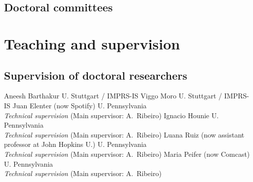 \documentclass{cvlfoc}
\begin{document}
\begin{entrydate}
\end{entrydate}


\subsection*{Doctoral committees}

\begin{entrydate}
\end{entrydate}



\section*{Teaching and supervision}
\vspace{0.2\baselineskip}

\subsection*{Supervision of doctoral researchers}

\begin{entrydate}
		{Aneesh Barthakur \hfill U. Stuttgart / IMPRS-IS}
		{Viggo Moro \hfill U. Stuttgart / IMPRS-IS}
		{Juan Elenter {\small (now Spotify)}
		\hfill U. Pennsylvania\\
			\emph{Technical supervision} \hfill(Main supervisor: A.\ Ribeiro)}
		{Ignacio Hounie \hfill U. Pennsylvania\\
			\emph{Technical supervision} \hfill(Main supervisor: A.\ Ribeiro)}
		{Luana Ruiz {\small (now assistant professor at John Hopkins U.)}
			\hfill U. Pennsylvania\\
			\emph{Technical supervision} \hfill(Main supervisor: A.\ Ribeiro)}
		{Maria Peifer {\small (now Comcast)}
		\hfill U. Pennsylvania\\
			\emph{Technical supervision} \hfill(Main supervisor: A.\ Ribeiro)}
\end{entrydate}
\end{document}
